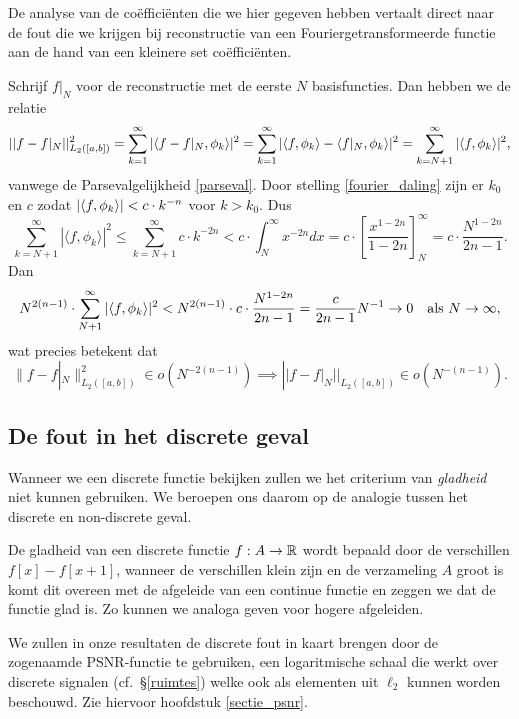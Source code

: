 De analyse van de co\"effici\"enten die we hier gegeven hebben vertaalt direct naar de fout die we krijgen
bij reconstructie van een Fouriergetransformeerde functie aan de hand van een kleinere set co\"effici\"enten.

\begin{gevolg}
Schrijf $f|_{N}$ voor de reconstructie met de eerste $N$ basisfuncties. Dan hebben we de relatie
\[
  || f - f|_N||^2_{L_2([a,b])} = \sum_{k=1}^\infty |\langle f-f|_N , \phi_k \rangle|^2 = \sum_{k=1}^\infty |\langle f , \phi_k \rangle 
  - \langle f|_N , \phi_k \rangle|^2 = \sum_{k=N+1}^\infty |\langle f , \phi_k \rangle|^2,
\]
vanwege de Parsevalgelijkheid \eqref{parseval}. Door stelling \ref{fourier_daling} zijn er $k_0$ en $c$ zodat ${\left| \langle f , \phi_k \rangle \right|} < c\cdot k^{-n}$ voor $k > k_0$. Dus
\[
	\sum_{k=N+1}^\infty | \langle f, \phi_{k} \rangle |^2 \leq \sum_{k=N+1}^\infty c \cdot k^{-2n} < c \cdot \int_{N}^\infty x^{-2n} dx = c \cdot \left[ \frac{x^{1-2n}}{1-2n} \right]^\infty_N = c \cdot \frac{N^{1-2n}}{2n-1}.
\]
Dan
\[
N^{2(n-1)} \cdot \sum_{N+1}^\infty |\langle f , \phi_k \rangle|^2 < N^{2(n-1)} \cdot c \cdot \frac{N^{1-2n}}{2n-1} = \frac{c}{2n-1} N^{-1} \to 0 \quad \text{als } N\to\infty,
\]
wat precies betekent dat
 \[
\|f-f|_{N}\|^2_{L_2([a,b])} \in o\left ( N^{-2(n-1)} \right) 
\implies ||f - f|_{N}||_{L_2([a,b])} \in o\left(N^{-(n-1)}\right).
\]
\end{gevolg}

\subsection{De fout in het discrete geval}
Wanneer we een discrete functie bekijken zullen we het criterium van \emph{gladheid} niet kunnen gebruiken.
We beroepen ons daarom op de analogie tussen het discrete en non-discrete geval.

De gladheid van een discrete functie $f:A\to\mathbb{R}$ wordt bepaald door de verschillen \mbox{$f[x]-f[x+1]$},
wanneer de verschillen klein zijn en de verzameling $A$ groot is komt dit overeen met de afgeleide van een 
continue functie en zeggen we dat de functie glad is. Zo kunnen we analoga geven voor hogere afgeleiden.

We zullen in onze resultaten de discrete fout in kaart brengen door de zogenaamde PSNR-functie te gebruiken,
een logaritmische schaal die werkt over discrete signalen (cf.~\S \ref{ruimtes}) welke ook als elementen uit $\ell_2$ kunnen worden beschouwd. Zie hiervoor hoofdstuk \ref{sectie_psnr}.

